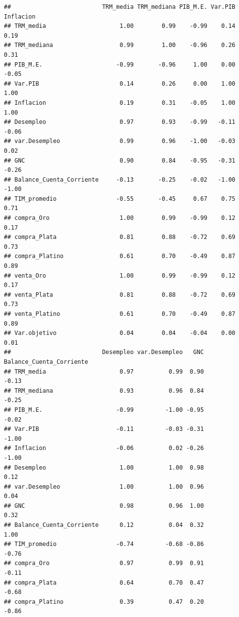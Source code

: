\documentclass[
  11pt,
  a4paper,
]{book}
\begin{document}
\begin{verbatim}
##                          TRM_media TRM_mediana PIB_M.E. Var.PIB Inflacion
## TRM_media                     1.00        0.99    -0.99    0.14      0.19
## TRM_mediana                   0.99        1.00    -0.96    0.26      0.31
## PIB_M.E.                     -0.99       -0.96     1.00    0.00     -0.05
## Var.PIB                       0.14        0.26     0.00    1.00      1.00
## Inflacion                     0.19        0.31    -0.05    1.00      1.00
## Desempleo                     0.97        0.93    -0.99   -0.11     -0.06
## var.Desempleo                 0.99        0.96    -1.00   -0.03      0.02
## GNC                           0.90        0.84    -0.95   -0.31     -0.26
## Balance_Cuenta_Corriente     -0.13       -0.25    -0.02   -1.00     -1.00
## TIM_promedio                 -0.55       -0.45     0.67    0.75      0.71
## compra_Oro                    1.00        0.99    -0.99    0.12      0.17
## compra_Plata                  0.81        0.88    -0.72    0.69      0.73
## compra_Platino                0.61        0.70    -0.49    0.87      0.89
## venta_Oro                     1.00        0.99    -0.99    0.12      0.17
## venta_Plata                   0.81        0.88    -0.72    0.69      0.73
## venta_Platino                 0.61        0.70    -0.49    0.87      0.89
## Var.objetivo                  0.04        0.04    -0.04    0.00      0.01
##                          Desempleo var.Desempleo   GNC Balance_Cuenta_Corriente
## TRM_media                     0.97          0.99  0.90                    -0.13
## TRM_mediana                   0.93          0.96  0.84                    -0.25
## PIB_M.E.                     -0.99         -1.00 -0.95                    -0.02
## Var.PIB                      -0.11         -0.03 -0.31                    -1.00
## Inflacion                    -0.06          0.02 -0.26                    -1.00
## Desempleo                     1.00          1.00  0.98                     0.12
## var.Desempleo                 1.00          1.00  0.96                     0.04
## GNC                           0.98          0.96  1.00                     0.32
## Balance_Cuenta_Corriente      0.12          0.04  0.32                     1.00
## TIM_promedio                 -0.74         -0.68 -0.86                    -0.76
## compra_Oro                    0.97          0.99  0.91                    -0.11
## compra_Plata                  0.64          0.70  0.47                    -0.68
## compra_Platino                0.39          0.47  0.20                    -0.86

\end{verbatim}
\end{document}
